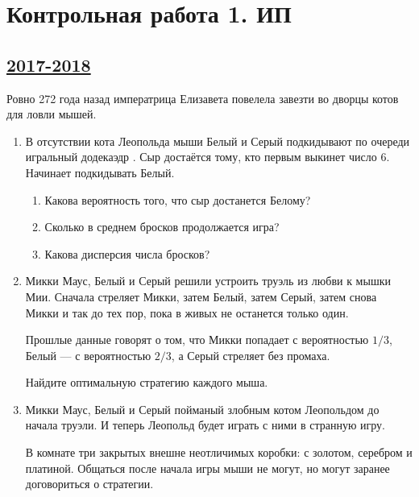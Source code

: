 \newpage
\section{Контрольная работа 1. ИП}



\subsection[2017-2018]{\hyperref[sec:sol_kr_01_ip_2017_2018]{2017-2018}}
\label{sec:kr_01_ip_2017_2018}



Ровно 272 года назад императрица Елизавета повелела завезти во дворцы котов для ловли мышей.


\begin{enumerate}

\item В отсутствии кота Леопольда мыши Белый и Серый подкидывают по очереди игральный додекаэдр
.
Сыр достаётся тому, кто первым выкинет число 6. Начинает подкидывать Белый.

\begin{enumerate}
  \item Какова вероятность того, что сыр достанется Белому?
  \item Сколько в среднем бросков продолжается игра?
  \item Какова дисперсия числа бросков?
\end{enumerate}

\item Микки Маус, Белый и Серый решили устроить труэль из любви к мышки Мии. Сначала стреляет Микки, затем Белый, затем Серый, затем снова Микки и так до тех пор, пока в живых не останется только один.

Прошлые данные говорят о том, что Микки попадает с вероятностью $1/3$, Белый — с вероятностью $2/3$, а Серый стреляет без промаха.

Найдите оптимальную стратегию каждого мыша.

\item Микки Маус, Белый и Серый пойманый злобным котом Леопольдом до начала труэли. И теперь Леопольд будет играть с ними в странную игру.

В комнате три закрытых внешне неотличимых коробки: с золотом, серебром и платиной. Общаться после начала игры мыши не могут, но могут заранее договориться о стратегии.


\end{enumerate}

